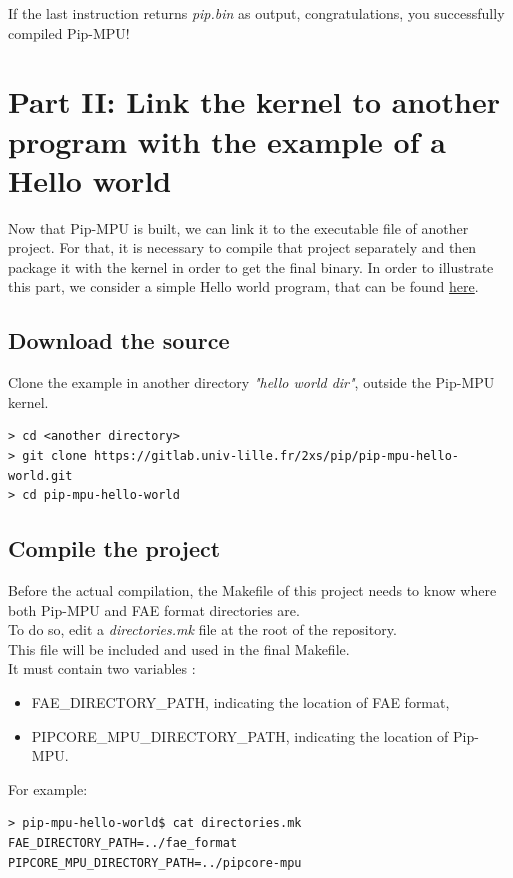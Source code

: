 \documentclass[10pt,a4paper,titlepage]{refart}
\begin{document}
If the last instruction returns \textit{pip.bin} as output, congratulations, you successfully compiled Pip-MPU!

\section{Part II: Link the kernel to another program with the example of a Hello world} \label{second}

Now that Pip-MPU is built, we can link it to the executable file of another project. For that, it is necessary to compile that project 
separately and then package it with the kernel in order to get the final binary. In order to illustrate this part, we consider a simple 
Hello world program, that can be found \href{(https://gitlab.univ-lille.fr/2xs/pip/pip-mpu-hello-world)}{here}.

\subsection{Download the source}
Clone the example in another directory \textit{"hello world dir"}, outside the Pip-MPU kernel.

\begin{lstlisting}[style=BashStyle]
> cd <another directory>
> git clone https://gitlab.univ-lille.fr/2xs/pip/pip-mpu-hello-world.git
> cd pip-mpu-hello-world
\end{lstlisting}

\subsection{Compile the project} \label{compileproject}
Before the actual compilation, the Makefile of this project needs to know where both Pip-MPU and FAE format directories are.\\
To do so, edit a \textit{directories.mk} file at the root of the repository.\\
This file will be included and used in the final Makefile.\\
It must contain two variables :
\begin{itemize}
    \item FAE\_DIRECTORY\_PATH, indicating the location of FAE format,
    \item PIPCORE\_MPU\_DIRECTORY\_PATH, indicating the location of Pip-MPU.
\end{itemize}

For example:
\begin{lstlisting}[style=BashStyle]
> pip-mpu-hello-world$ cat directories.mk
FAE_DIRECTORY_PATH=../fae_format
PIPCORE_MPU_DIRECTORY_PATH=../pipcore-mpu
\end{lstlisting}
\end{document}
